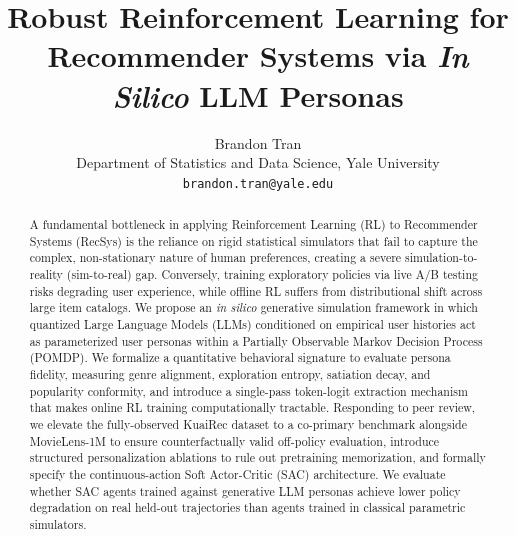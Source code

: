\documentclass{article}
\title{Robust Reinforcement Learning for Recommender Systems via \textit{In Silico} LLM Personas}
\author{%
  Brandon Tran \\
  Department of Statistics and Data Science, Yale University \\
  \texttt{brandon.tran@yale.edu} \\
}
\begin{document}
\maketitle

\begin{abstract}
A fundamental bottleneck in applying Reinforcement Learning (RL) to Recommender Systems (RecSys) is the reliance on rigid statistical simulators that fail to capture the complex, non-stationary nature of human preferences, creating a severe simulation-to-reality (sim-to-real) gap. Conversely, training exploratory policies via live A/B testing risks degrading user experience, while offline RL suffers from distributional shift across large item catalogs. We propose an \textit{in silico} generative simulation framework in which quantized Large Language Models (LLMs) conditioned on empirical user histories act as parameterized user personas within a Partially Observable Markov Decision Process (POMDP). We formalize a quantitative behavioral signature to evaluate persona fidelity, measuring genre alignment, exploration entropy, satiation decay, and popularity conformity, and introduce a single-pass token-logit extraction mechanism that makes online RL training computationally tractable. Responding to peer review, we elevate the fully-observed KuaiRec dataset to a co-primary benchmark alongside MovieLens-1M to ensure counterfactually valid off-policy evaluation, introduce structured personalization ablations to rule out pretraining memorization, and formally specify the continuous-action Soft Actor-Critic (SAC) architecture. We evaluate whether SAC agents trained against generative LLM personas achieve lower policy degradation on real held-out trajectories than agents trained in classical parametric simulators.
\end{abstract}
\end{document}
